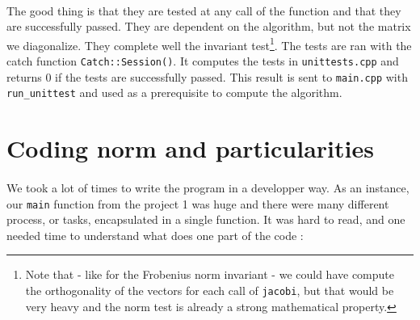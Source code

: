 \documentclass[a4paper, twoside, 11pt]{report}
\theoremstyle{theorem}
\theoremstyle{remark}
\theoremstyle{exemple}
\begin{document}
			\paragraph{}The good thing is that they are tested at any call of the function and that they are successfully passed. They are dependent on the algorithm, but not the matrix we diagonalize. They complete well the invariant test\footnote{Note that - like for the Frobenius norm invariant - we could have compute the orthogonality of the vectors for each call of \texttt{jacobi}, but that would be very heavy and the norm test is already a strong mathematical property.}. The tests are ran with the catch function \texttt{Catch::Session()}. It computes the tests in \texttt{unittests.cpp} and returns $0$ if the tests are successfully passed. This result is sent to \texttt{main.cpp} with \texttt{run\_unittest} and used as a prerequisite to compute the algorithm.
    
    \section{Coding norm and particularities}
    	    \paragraph{}We took a lot of times to write the program in a developper way. As an instance, our \texttt{main} function from the project 1 was huge and there were many different process, or tasks, encapsulated in a single function. It was hard to read, and one needed time to understand what does one part of the code :
		
\end{document}
